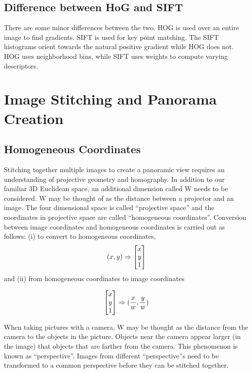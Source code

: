\documentclass{article}
\begin{document}
\subsection{Difference between HoG and SIFT}
There are some minor differences between the two. HOG is used over an entire image to find gradients. SIFT is used for key point matching. The SIFT histograms orient towards the natural positive gradient while HOG does not. HOG uses neighborhood bins, while SIFT uses weights to compute varying descriptors.

\section{Image Stitching and Panorama Creation}

\subsection{Homogeneous Coordinates}
Stitching together multiple images to create a panoramic view requires an understanding of projective geometry and homography. In addition to our familiar 3D Euclidean space, an additional dimension called W needs to be considered. W may be thought of as the distance between a projector and an image. The four dimensional space is called “projective space” and the coordinates in projective space are called “homogeneous coordinates”. Conversion between image coordinates and homogeneous coordinates is carried out as follows: (i) to convert to homogeneous coordinates,
\break
\begin{equation*}
\centering
(x, y) \Rightarrow \begin{bmatrix}
x\\ 
y\\ 
1
\end{bmatrix}
\end{equation*}
\break
and (ii) from homogeneous coordinates to image coordinates

\begin{equation*}
\centering
\begin{bmatrix}
x\\ 
y\\ 
1
\end{bmatrix} 
 \Rightarrow
( \frac{x}{w}, \frac{y}{w} )
\end{equation*}


When taking pictures with a camera, W may be thought as the distance from the camera to the objects in the picture. Objects near the camera appear larger (in the image) that objects that are farther from the camera. This phenomenon is known as “perspective”. Images from different “perspective”s need to be transformed to a common perspective before they can be stitched together.
\end{document}
